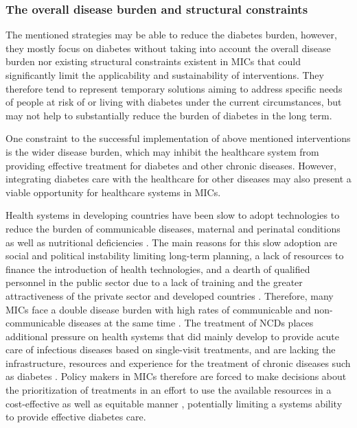 \subsubsection{The overall disease burden and structural constraints}

The mentioned strategies may be able to reduce the diabetes burden, however, they mostly focus on diabetes without taking into account the overall disease burden nor existing structural constraints existent in \acp{MIC} that could significantly limit the applicability and sustainability of interventions. They therefore tend to represent temporary solutions aiming to address specific needs of people at risk of or living with diabetes under the current circumstances, but may not help to substantially reduce the burden of diabetes in the long term.

One constraint to the successful implementation of above mentioned interventions is the wider disease burden, which may inhibit the healthcare system  from providing effective treatment for diabetes and other chronic diseases. However, integrating diabetes care with the healthcare for other diseases may also present a viable opportunity for healthcare systems in \acp{MIC}.

Health systems in developing countries have been slow to adopt technologies to reduce the burden of communicable diseases, maternal and perinatal conditions as well as nutritional deficiencies \parencite{Gutierrez-delgado2009}. The main reasons for this slow adoption are social and political instability limiting long-term planning, a lack of resources to finance the introduction of health technologies, and a dearth of qualified personnel in the public sector due to a lack of training and the greater attractiveness of the private sector and developed countries \parencite{Gutierrez-delgado2009}. Therefore, many \acp{MIC} face a double disease burden with high rates of communicable and non-communicable diseases at the same time \parencite{Gutierrez-delgado2009}. The treatment of \acp{NCD} places additional pressure on health systems that did mainly develop to provide acute care of infectious diseases based on single-visit treatments, and are lacking the infrastructure, resources and experience for the treatment of chronic diseases such as diabetes \parencite{Nulu2016}. Policy makers in \acp{MIC} therefore are forced to make decisions about the prioritization of treatments in an effort to use the available resources in a cost-effective as well as equitable manner \parencite{Gutierrez-delgado2009}, potentially limiting a systems ability to provide effective diabetes care.


